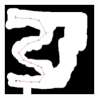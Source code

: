 \begin{figure}[ht]
    \centering
	\includegraphics[width=0.35\textwidth, angle=0]{img/p5.png} 
\end{figure}
